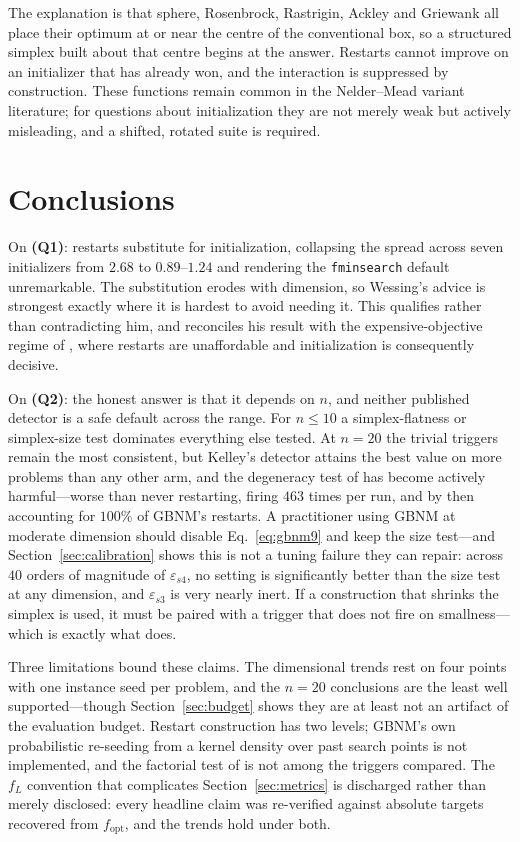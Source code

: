 \documentclass[11pt,a4paper]{article}
\begin{document}
The explanation is that sphere, Rosenbrock, Rastrigin, Ackley and Griewank all
place their optimum at or near the centre of the conventional box, so a
structured simplex built about that centre begins at the answer. Restarts cannot
improve on an initializer that has already won, and the interaction is
suppressed by construction. These functions remain common in the Nelder--Mead
variant literature; for questions about initialization they are not merely weak
but actively misleading, and a shifted, rotated suite is required.

\section{Conclusions}

On \textbf{(Q1)}: restarts substitute for initialization, collapsing the spread
across seven initializers from $2.68$ to $0.89$--$1.24$ and rendering the
\texttt{fminsearch} default unremarkable. The substitution erodes with
dimension, so Wessing's advice is strongest exactly where it is hardest to avoid
needing it. This qualifies \citet{wessing2019} rather than contradicting him, and
reconciles his result with the expensive-objective regime of
\citet{takenaga2023}, where restarts are unaffordable and initialization is
consequently decisive.

On \textbf{(Q2)}: the honest answer is that it depends on $n$, and neither
published detector is a safe default across the range. For $n\le10$ a
simplex-flatness or simplex-size test dominates everything else tested. At
$n=20$ the trivial triggers remain the most consistent, but Kelley's detector
attains the best value on more problems than any other arm, and the degeneracy
test of \citet{luersen2004} has become actively harmful---worse than never
restarting, firing $463$ times per run, and by then accounting for $100\%$ of
GBNM's restarts. A practitioner using GBNM at moderate dimension should disable
Eq.~\eqref{eq:gbnm9} and keep the size test---and Section~\ref{sec:calibration}
shows this is not a tuning failure they can repair: across $40$ orders of
magnitude of $\varepsilon_{s4}$, no setting is significantly better than the size
test at any dimension, and $\varepsilon_{s3}$ is very nearly inert. If a construction that shrinks the
simplex is used, it must be paired with a trigger that does not fire on
smallness---which is exactly what \citet{kelley1999} does.

Three limitations bound these claims. The dimensional trends rest on four
points with one instance seed per problem, and the $n=20$ conclusions are the
least well supported---though Section~\ref{sec:budget} shows they are at least
not an artifact of the evaluation budget. Restart construction has two levels; GBNM's own
probabilistic re-seeding from a kernel density over past search points is not
implemented, and the factorial test of \citet{oneill1971} is not among the
triggers compared. The $f_L$ convention that complicates
Section~\ref{sec:metrics} is discharged rather than merely disclosed: every
headline claim was re-verified against absolute targets recovered from
$f_{\mathrm{opt}}$, and the trends hold under both.
\end{document}
